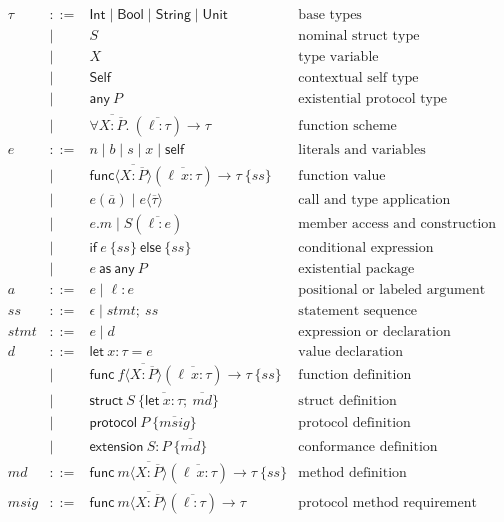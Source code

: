 \documentclass[manuscript]{acmart}
\newcommand{\kw}[1]{\ensuremath{\mathsf{#1}}}
\newcommand{\Int}{\kw{Int}}
\newcommand{\Bool}{\kw{Bool}}
\newcommand{\String}{\kw{String}}
\newcommand{\Unit}{\kw{Unit}}
\newcommand{\Self}{\kw{Self}}
\newcommand{\Any}[1]{\kw{any}\ #1}
\newcommand{\ftype}[3]{\forall #1.\ (#2) \to #3}
\begin{document}
\[
\begin{array}{rcll}
\tau & ::= & \Int \mid \Bool \mid \String \mid \Unit
  & \text{base types} \\
& \mid & S
  & \text{nominal struct type} \\
& \mid & X
  & \text{type variable} \\
& \mid & \Self
  & \text{contextual self type} \\
& \mid & \Any{P}
  & \text{existential protocol type} \\
& \mid & \ftype{\overline{X : \overline{P}}}{\overline{\ell : \tau}}{\tau}
  & \text{function scheme} \\[2mm]

e & ::= & n \mid b \mid s \mid x \mid \kw{self}
  & \text{literals and variables} \\
& \mid & \kw{func}\langle\overline{X : \overline{P}}\rangle
          (\overline{\ell\ x : \tau}) \to \tau\ \{ ss \}
  & \text{function value} \\
& \mid & e(\overline{a}) \mid e\langle\overline{\tau}\rangle
  & \text{call and type application} \\
& \mid & e.m \mid S(\overline{\ell : e})
  & \text{member access and construction} \\
& \mid & \kw{if}\ e\ \{ ss \}\ \kw{else}\ \{ ss \}
  & \text{conditional expression} \\
& \mid & e\ \kw{as}\ \Any{P}
  & \text{existential package} \\[2mm]

a & ::= & e \mid \ell : e
  & \text{positional or labeled argument} \\[2mm]

ss & ::= & \epsilon \mid stmt;\ ss
  & \text{statement sequence} \\
stmt & ::= & e \mid d
  & \text{expression or declaration} \\[2mm]

d & ::= & \kw{let}\ x : \tau = e
  & \text{value declaration} \\
& \mid & \kw{func}\ f\langle\overline{X : \overline{P}}\rangle
          (\overline{\ell\ x : \tau}) \to \tau\ \{ ss \}
  & \text{function definition} \\
& \mid & \kw{struct}\ S\ \{ \overline{\kw{let}\ x : \tau};\ \overline{md} \}
  & \text{struct definition} \\
& \mid & \kw{protocol}\ P\ \{ \overline{msig} \}
  & \text{protocol definition} \\
& \mid & \kw{extension}\ S : P\ \{ \overline{md} \}
  & \text{conformance definition} \\[2mm]

md & ::= & \kw{func}\ m\langle\overline{X : \overline{P}}\rangle
          (\overline{\ell\ x : \tau}) \to \tau\ \{ ss \}
  & \text{method definition} \\
msig & ::= & \kw{func}\ m\langle\overline{X : \overline{P}}\rangle
          (\overline{\ell : \tau}) \to \tau
  & \text{protocol method requirement}
\end{array}
\]
\end{document}
